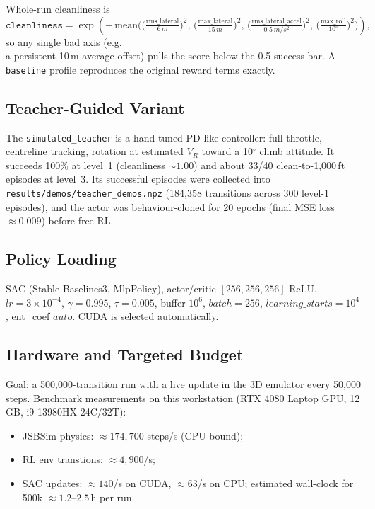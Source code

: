 \documentclass[11pt,a4paper]{article}
\begin{document}
Whole-run cleanliness is
\[
\mathtt{cleanliness} = \exp\!\left(-\,\mathrm{mean}\Big( \Big(\tfrac{\mathrm{rms\_lateral}}{6\,m}\Big)^2,\,
\Big(\tfrac{\mathrm{max\_lateral}}{15\,m}\Big)^2,\,
\Big(\tfrac{\mathrm{rms\_lateral\_accel}}{0.5\,m/s^2}\Big)^2,\,
\Big(\tfrac{\mathrm{max\_roll}}{10^\circ}\Big)^2 \Big)\right),
\]
so any single bad axis (e.g.\\ a persistent 10\,m average offset) pulls the score below the 0.5 success bar.
A \texttt{baseline} profile reproduces the original reward terms exactly.

\subsection{Teacher-Guided Variant}
The \texttt{simulated\_teacher} is a hand-tuned PD-like controller: full throttle, centreline tracking,
rotation at estimated $V_R$ toward a 10$^\circ$ climb attitude. It succeeds 100\% at level~1 (cleanliness $\sim 1.00$)
and about 33/40 clean-to-1,000\,ft episodes at level~3. Its successful episodes were collected into
\texttt{results/demos/teacher\_demos.npz} (184,358 transitions across 300 level-1 episodes), and the actor
was behaviour-cloned for 20 epochs (final MSE loss $\approx 0.009$) before free RL.

\subsection{Policy Loading}
SAC (Stable-Baselines3, MlpPolicy), actor/critic $[256,256,256]$ ReLU, $lr=3\!\times\!10^{-4}$,
$\gamma=0.995$, $\tau=0.005$, buffer $10^6$, $batch=256$, $learning\_starts=10^4$, ent\_coef $auto$.
CUDA is selected automatically.

\subsection{Hardware and Targeted Budget}
Goal: a 500,000-transition run with a live update in the 3D emulator every 50,000 steps.
Benchmark measurements on this workstation (RTX 4080 Laptop GPU, 12\,GB, i9-13980HX 24C/32T):
\begin{itemize}
\item JSBSim physics: $\approx 174{,}700$ steps/s (CPU bound); \item RL env transtions: $\approx 4{,}900$/s;
\item SAC updates: $\approx 140$/s on CUDA, $\approx 63$/s on CPU; estimated wall-clock for 500k $\approx 1.2$--$2.5\,$h per run.
\end{itemize}
\end{document}
